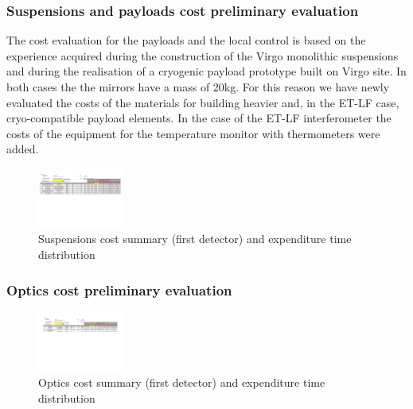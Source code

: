 %
%
\subsubsection[Suspensions costs]{Suspensions and payloads cost preliminary evaluation}
%  
\label{ConclusionsSuspCostsSubSection}
%
The cost evaluation for the payloads and the local control is based on the experience acquired during the construction of the Virgo monolithic suspensions and during the realisation of a cryogenic payload prototype built on Virgo site. In both cases the the mirrors have a mass of 20kg. 
For this reason we have newly evaluated the costs of the materials for building heavier and, in the ET-LF case, cryo-compatible  payload elements. 
In the case of the ET-LF interferometer the costs of the equipment for the temperature monitor with thermometers were added.
%
\FloatBarrier
\begin{figure}[h]
\centering 
\includegraphics[angle=90, width=0.25\textwidth]{Sec_Conclusions/ET-cost-v00r05-Suspensions.pdf}
\caption{Suspensions cost summary (first detector) and expenditure time distribution}
\label{Fig:SuspensionsCostTable}
\end{figure}

%
%
\subsubsection[Optics costs]{Optics cost preliminary evaluation}
%  
\label{ConclusionsOpticsCostsSubSection}
%
%

%
\FloatBarrier
\begin{figure}[h]
\centering 
\includegraphics[angle=90, width=0.25\textwidth]{Sec_Conclusions/ET-cost-v00r05-Optics.pdf}
\caption{Optics cost summary (first detector) and expenditure time distribution}
\label{Fig:OpticsCostTable}
\end{figure}

